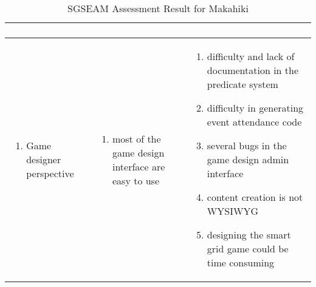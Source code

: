 \begin{table}[ht!]
\begin{tabular}{|P{0.17\columnwidth}|P{0.36\columnwidth}|P{0.36\columnwidth}|}
\begin{enumerate}[nosep, leftmargin=*]
    \end{enumerate} \\
    \hline
    \begin{enumerate}[label={}, nosep, leftmargin=*]
    \item Game designer perspective
    \end{enumerate}
    & 
    \begin{enumerate}[label={}, nosep, leftmargin=*]
    \item most of the game design interface are easy to use 
    \end{enumerate} 
    & 
    \begin{enumerate}[nosep, leftmargin=*]
    \item difficulty and lack of documentation in the predicate system 
    \item difficulty in generating event attendance code
    \item several bugs in the game design admin interface 
    \item content creation is not WYSIWYG
    \item designing the smart grid game could be time consuming
    \end{enumerate} \\
    \hline
  \end{tabular}
  \caption{SGSEAM Assessment Result for Makahiki}
  \label{table:assessment-result}
\end{table}

\clearpage    

